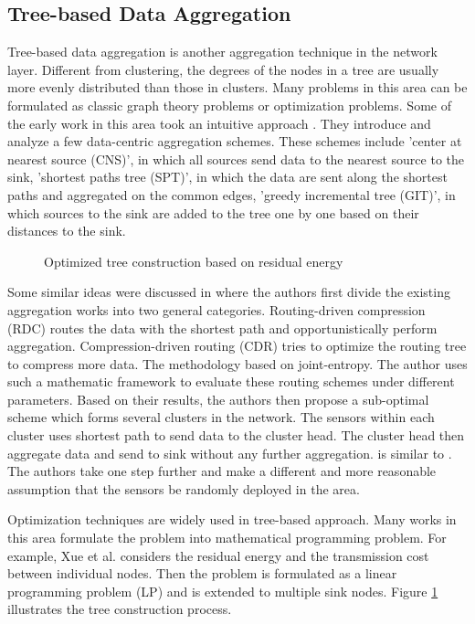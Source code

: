 \subsection{Tree-based Data Aggregation}
Tree-based data aggregation is another aggregation technique in the network layer. Different from clustering, the degrees of the nodes in a tree are usually more evenly distributed than those in clusters. Many problems in this area can be formulated as classic graph theory problems or optimization problems. Some of the early work in this area took an intuitive approach \cite{impactaggregation}. They introduce and analyze a few data-centric aggregation schemes. These schemes include 'center at nearest source (CNS)', in which all sources send data to the nearest source to the sink, 'shortest paths tree (SPT)', in which the data are sent along the shortest paths and aggregated on the common edges, 'greedy incremental tree (GIT)', in which sources to the sink are added to the tree one by one based on their distances to the sink.

\begin{figure}
\centering
{}
\caption{Optimized tree construction based on residual energy}
\label{fig:lpt}
\end{figure}

Some similar ideas were discussed in \cite{pattem:impact} where the authors first divide the existing aggregation works into two general categories. Routing-driven compression (RDC) routes the data with the shortest path and opportunistically perform aggregation. Compression-driven routing (CDR) tries to optimize the routing tree to compress more data. The methodology based on joint-entropy. The author uses such a mathematic framework to evaluate these routing schemes under different parameters. Based on their results, the authors then propose a sub-optimal scheme which forms several clusters in the network. The sensors within each cluster uses shortest path to send data to the cluster head. The cluster head then aggregate data and send to sink without any further aggregation. \cite{asc} is similar to \cite{pattem:impact}. The authors take one step further and make a different and more reasonable assumption that the sensors be randomly deployed in the area.

Optimization techniques are widely used in tree-based approach. Many works in this area formulate the problem into mathematical programming problem. For example, Xue et al. \cite{xue:lp} considers the residual energy and the transmission cost between individual nodes. Then the problem is formulated as a linear programming problem (LP) and is extended to multiple sink nodes. Figure \ref{fig:lpt} illustrates the tree construction process.

